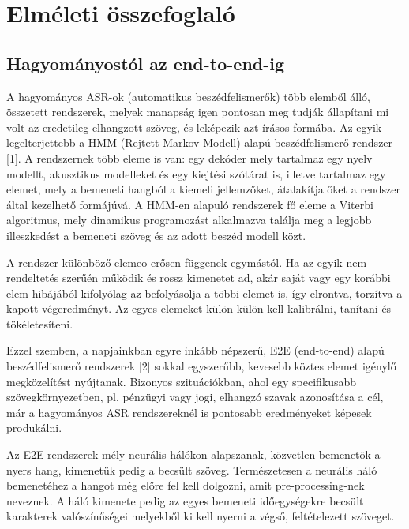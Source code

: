 \chapter{Elméleti összefoglaló}

\section{Hagyományostól az end-to-end-ig}

A hagyományos ASR-ok (automatikus beszédfelismerők) több elemből álló, összetett rendszerek, melyek manapság igen pontosan meg tudják állapítani mi volt az eredetileg elhangzott szöveg, és leképezik azt írásos formába. Az egyik legelterjettebb a HMM (Rejtett Markov Modell) alapú beszédfelismerő rendszer [1]. A rendszernek több eleme is van: egy dekóder mely tartalmaz egy nyelv modellt, akusztikus modelleket és egy kiejtési szótárat is, illetve tartalmaz egy elemet, mely a bemeneti hangból a kiemeli jellemzőket, átalakítja őket a rendszer által kezelhető formájúvá. A HMM-en alapuló rendszerek fő eleme a Viterbi algoritmus, mely dinamikus programozást alkalmazva találja meg a legjobb illeszkedést a bemeneti szöveg és az adott beszéd modell közt.

A rendszer különböző elemeo erősen függenek egymástól. Ha az egyik nem rendeltetés szerűén működik és rossz kimenetet ad, akár saját vagy egy korábbi elem hibájából kifolyólag az befolyásolja a többi elemet is, így elrontva, torzítva a kapott végeredményt. Az egyes elemeket külön-külön kell kalibrálni, tanítani és tökéletesíteni.

Ezzel szemben, a napjainkban egyre inkább népszerű, E2E (end-to-end) alapú beszédfelismerő rendszerek [2] sokkal egyszerűbb, kevesebb köztes elemet igénylő megközelítést nyújtanak. Bizonyos szituációkban, ahol egy specifikusabb szövegkörnyezetben, pl. pénzügyi vagy jogi, elhangzó szavak azonosítása a cél, már a hagyományos ASR rendszereknél is pontosabb eredményeket képesek produkálni.

Az E2E rendszerek mély neurális hálókon alapszanak, közvetlen bemenetök a nyers hang, kimenetük pedig a becsült szöveg. Természetesen a neurális háló bemenetéhez a hangot még előre fel kell dolgozni, amit pre-processing-nek neveznek. A háló kimenete pedig az egyes bemeneti időegységekre becsült karakterek valószínűségei melyekből ki kell nyerni a végső, feltételezett szöveget.

